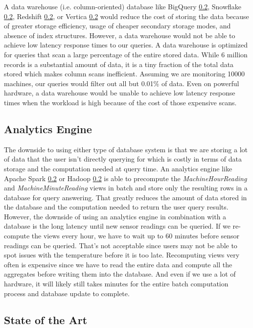 \documentclass[	DIV=calc,%
							paper=letter,%
							fontsize=11pt,%
							twocolumn]{scrartcl}	 					%
\begin{document}
A data warehouse (i.e. column-oriented) database like BigQuery \ref{}, Snowflake \ref{}, Redshift \ref{}, or Vertica \ref{} would reduce the cost of storing the data because of greater storage efficiency, usage of cheaper secondary storage modes, and absence of index structures. However, a data warehouse would not be able to achieve low latency response times to our queries. A data warehouse is optimized for queries that scan a large percentage of the entire stored data. While 6 million records is a substantial amount of data, it is a tiny fraction of the total data stored which makes column scans inefficient. Assuming we are monitoring 10000 machines, our queries would filter out all but 0.01\% of data. Even on powerful hardware, a data warehouse would be unable to achieve low latency response times when the workload is high because of the cost of those expensive scans.

\subsection{Analytics Engine}

The downside to using either type of database system is that we are storing a lot of data that the user isn't directly querying for which is costly in terms of data storage and the computation needed at query time. An analytics engine like Apache Spark \ref{} or Hadoop \ref{} is able to precompute the \emph{MachineHourReading} and \emph{MachineMinuteReading} views in batch and store only the resulting rows in a database for query answering. That greatly reduces the amount of data stored in the database and the computation needed to return the user query results. However, the downside of using an analytics engine in combination with a database is the long latency until new sensor readings can be queried. If we re-compute the views every hour, we have to wait up to 60 minutes before sensor readings can be queried. That's not acceptable since users may not be able to spot issues with the temperature before it is too late. Recomputing views very often is expensive since we have to read the entire data and compute all the aggregates before writing them into the database. And even if we use a lot of hardware, it will likely still takes minutes for the entire batch computation process and database update to complete.

\subsection{State of the Art}
\end{document}
